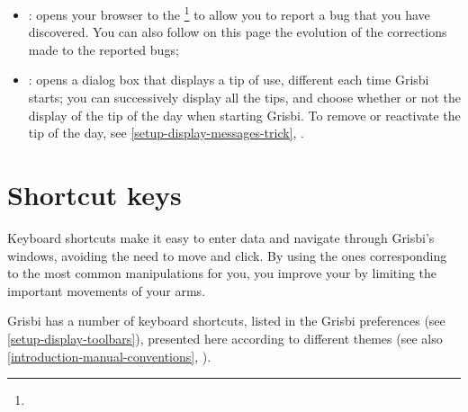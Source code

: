 \begin{itemize}
	\item {}: opens your browser to the \footnote{\urlBugTracker{}} to allow you to report a bug that you have discovered. You can also follow on this page the evolution of the corrections made to the reported bugs;
	\item {}: opens a dialog box that displays a tip of use, different each time Grisbi starts; you can successively display all the tips, and choose whether or not the display of the tip of the day when starting Grisbi. To remove or reactivate the tip of the day, see \vref{setup-display-messages-trick}, .
\end{itemize}


\section{Shortcut keys\label{home-shortcuts}}


Keyboard shortcuts make it easy to enter data and navigate through Grisbi's windows, avoiding the need to move and click. By using the ones corresponding to the most common manipulations for you, you improve your  by limiting the important movements of your arms.

Grisbi has a number of keyboard shortcuts, listed in the Grisbi preferences (see \vref{setup-display-toolbars}), presented here according to different themes (see also  \vref{introduction-manual-conventions}, ).

